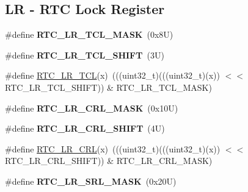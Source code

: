 \subsection*{LR -\/ R\+TC Lock Register}
\begin{DoxyCompactItemize}
\item 
\mbox{\label{group___r_t_c___register___masks_ga89f5d0ce94e7eb13bd961774fd440c0b}} 
\#define {\bfseries R\+T\+C\+\_\+\+L\+R\+\_\+\+T\+C\+L\+\_\+\+M\+A\+SK}~(0x8\+U)
\item 
\mbox{\label{group___r_t_c___register___masks_ga3f1532cd2a9c7b767e2363ddde7777c4}} 
\#define {\bfseries R\+T\+C\+\_\+\+L\+R\+\_\+\+T\+C\+L\+\_\+\+S\+H\+I\+FT}~(3\+U)
\item 
\#define \mbox{\hyperlink{group___r_t_c___register___masks_ga62e9dbab511a4f727dd4674932501fee}{R\+T\+C\+\_\+\+L\+R\+\_\+\+T\+CL}}(x)~(((uint32\+\_\+t)(((uint32\+\_\+t)(x)) $<$$<$ R\+T\+C\+\_\+\+L\+R\+\_\+\+T\+C\+L\+\_\+\+S\+H\+I\+FT)) \& R\+T\+C\+\_\+\+L\+R\+\_\+\+T\+C\+L\+\_\+\+M\+A\+SK)
\item 
\mbox{\label{group___r_t_c___register___masks_ga79d7286374cccca93261d4ced777c2e7}} 
\#define {\bfseries R\+T\+C\+\_\+\+L\+R\+\_\+\+C\+R\+L\+\_\+\+M\+A\+SK}~(0x10\+U)
\item 
\mbox{\label{group___r_t_c___register___masks_ga170e66be6136b04cac5df94c81675cc5}} 
\#define {\bfseries R\+T\+C\+\_\+\+L\+R\+\_\+\+C\+R\+L\+\_\+\+S\+H\+I\+FT}~(4\+U)
\item 
\#define \mbox{\hyperlink{group___r_t_c___register___masks_ga1a502847fc337b81764e45ee3bfd06d4}{R\+T\+C\+\_\+\+L\+R\+\_\+\+C\+RL}}(x)~(((uint32\+\_\+t)(((uint32\+\_\+t)(x)) $<$$<$ R\+T\+C\+\_\+\+L\+R\+\_\+\+C\+R\+L\+\_\+\+S\+H\+I\+FT)) \& R\+T\+C\+\_\+\+L\+R\+\_\+\+C\+R\+L\+\_\+\+M\+A\+SK)
\item 
\mbox{\label{group___r_t_c___register___masks_ga0681f481e213872418c16d5e012e5603}} 
\#define {\bfseries R\+T\+C\+\_\+\+L\+R\+\_\+\+S\+R\+L\+\_\+\+M\+A\+SK}~(0x20\+U)
\item 
\mbox{\label{group___r_t_c___register___masks_ga33823f8e5a5e100db14493426af60d67}} 

\end{DoxyCompactItemize}

